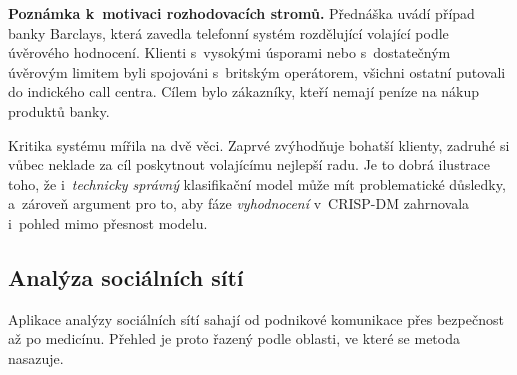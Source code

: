\documentclass[11pt,a4paper]{article}
\theoremstyle{definition}
\begin{document}
\textbf{Poznámka k~motivaci rozhodovacích stromů.} Přednáška uvádí případ banky Barclays, která
zavedla telefonní systém rozdělující volající podle úvěrového hodnocení. Klienti s~vysokými
úsporami nebo s~dostatečným úvěrovým limitem byli spojováni s~britským operátorem, všichni
ostatní putovali do indického call centra. Cílem bylo  zákazníky, kteří nemají
peníze na nákup produktů banky.

Kritika systému mířila na dvě věci. Zaprvé zvýhodňuje bohatší klienty, zadruhé si vůbec neklade
za cíl poskytnout volajícímu nejlepší radu. Je to dobrá ilustrace toho, že i~\emph{technicky
správný} klasifikační model může mít problematické důsledky, a~zároveň argument pro to, aby fáze
\emph{vyhodnocení} v~CRISP-DM zahrnovala i~pohled mimo přesnost modelu.

\subsection{Analýza sociálních sítí}

Aplikace analýzy sociálních sítí sahají od podnikové komunikace přes bezpečnost až po medicínu.
Přehled je proto řazený podle oblasti, ve které se metoda nasazuje.
\end{document}
